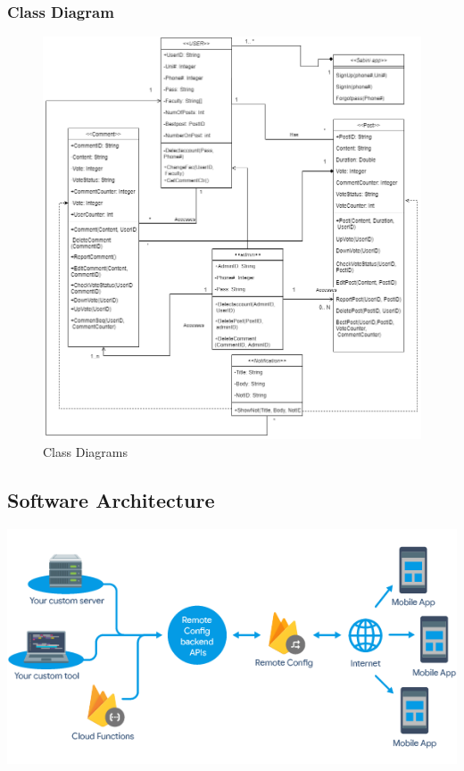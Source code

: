 \documentclass[12pt]{article}
\begin{document}
\sectionbreak
\vspace{+6em}
\subsubsection{Class Diagram}
\vspace{-1.4em}
\begin{figure}[h!]
\centerline{\includegraphics[width=1.1\textwidth]{./ClassDiagram/ClassDiagram.PNG}}
  \caption{Class Diagrams}
\end{figure}
\clearpage
\subsection{Software Architecture}
\centerline{\includegraphics[width=1.1\textwidth]{./SoftwareArch/SoftwareArch.PNG}}




\end{document}
